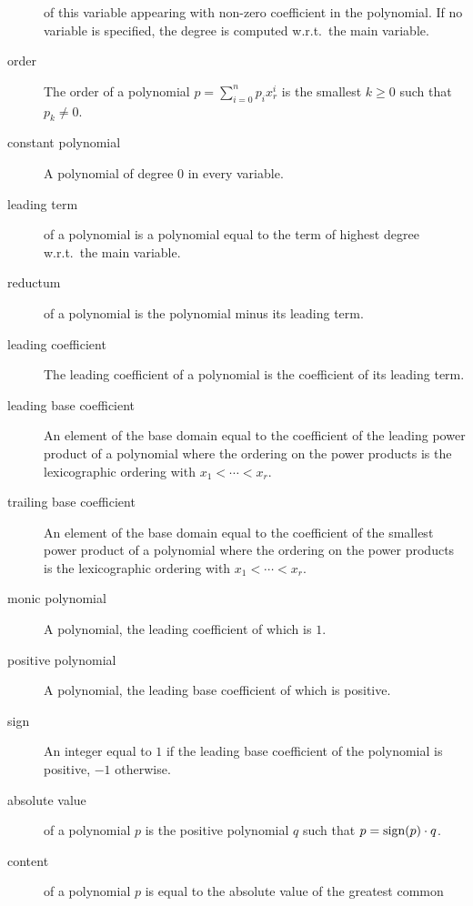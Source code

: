 \begin{description}
  of this variable appearing with non-zero coefficient in the polynomial.
  If no variable is specified, the degree is computed w.r.t.\ the main
  variable.
\item[order]
  The order of a polynomial $p = \sum_{i=0}^n p_i x_r^i$ is the smallest $k
  \geq 0$ such that $p_k \neq 0$.
\item[constant polynomial]
  A polynomial of degree 0 in every variable.
\item[leading term]
  of a polynomial is a polynomial equal to the term of highest
  degree w.r.t.\ the main variable.
\item[reductum]
  of a polynomial is the polynomial minus its leading term.
\item[leading coefficient]
  The leading coefficient of a polynomial is the coefficient of its leading
  term.
\item[leading base coefficient]
  An element of the base domain equal to the coefficient of the leading
  power product of a polynomial where the ordering on the power products is
  the lexicographic ordering with $x_1 < \cdots < x_r$.
\item[trailing base coefficient]
  An element of the base domain equal to the coefficient of the smallest
  power product of a polynomial where the ordering on the power products is
  the lexicographic ordering with $x_1 < \cdots < x_r$.
\item[monic polynomial]
  A polynomial, the leading coefficient of which is $1$.
\item[positive polynomial]
  A polynomial, the leading base coefficient of which is positive.
\item[sign]
  An integer equal to $1$ if the leading base coefficient of the polynomial
  is positive, $-1$ otherwise.
\item[absolute value]
  of a polynomial $p$ is the positive polynomial $q$ such that $p =
  \mbox{\rm sign}(p) \cdot q$.
\item[content]
  of a polynomial $p$ is equal to the absolute value of the greatest common

\end{description}
